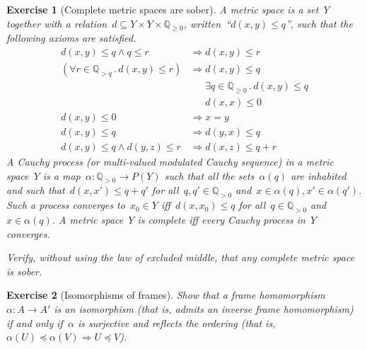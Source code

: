\documentclass{ws-rv9x6}
\newtheorem{ex}{Exercise}
\newenvironment{exercise}[1]{
  \begin{ex}[#1]
}{\end{ex}}
\newcommand{\QQ}{\mathbb{Q}}
\renewcommand{\_}{\mathpunct{.}}
\newcommand{\?}{\,{:}\,}
\begin{document}
\begin{exercise}{Complete metric spaces are sober}
A \emph{metric space} is a set~$Y$ together with a relation~$d \subseteq Y
\times Y \times \QQ_{\geq0}$, written~``$d(x,y) \leq q$'', such that the
following axioms are satisfied.
\begin{align*}
  d(x,y) \leq q \wedge q \leq r &\Longrightarrow d(x,y) \leq r \\
  (\forall r \in \QQ_{> q}\_ d(x,y) \leq r) &\Longrightarrow d(x,y) \leq q \\
  &\mathrel{\phantom{\Longrightarrow}} \exists q \in \QQ_{\geq0}\_ d(x,y) \leq q \\
  &\mathrel{\phantom{\Longrightarrow}} d(x,x) \leq 0 \\
  d(x,y) \leq 0 &\Longrightarrow x = y \\
  d(x,y) \leq q &\Longrightarrow d(y,x) \leq q \\
  d(x,y) \leq q \wedge d(y,z) \leq r &\Longrightarrow d(x,z) \leq q+r
\end{align*}
A \emph{Cauchy process} (or \emph{multi-valued modulated Cauchy sequence}) in a metric
space~$Y$ is a map~$\alpha : \QQ_{>0} \to P(Y)$ such that all the sets~$\alpha(q)$
are inhabited and such that~$d(x,x') \leq q + q'$ for all~$q,q' \in \QQ_{>0}$
and~$x \in \alpha(q), x' \in \alpha(q')$. Such a process \emph{converges
to}~$x_0 \in Y$ iff~$d(x,x_0) \leq q$ for all~$q \in \QQ_{>0}$
and~$x \in \alpha(q)$. A metric space~$Y$ is \emph{complete} iff every Cauchy
process in~$Y$ converges.

Verify, without using the law of excluded middle, that any complete metric
space is sober. \smallskip

\end{exercise}

\begin{exercise}{Isomorphisms of frames}%
\label{ex:isomorphisms-of-frames}%
Show that a frame homomorphism~$\alpha : A \to A'$ is an isomorphism (that is,
admits an inverse frame homomorphism) if and only if~$\alpha$ is surjective and
reflects the ordering (that is,~$\alpha(U) \preceq \alpha(V) \Rightarrow U
\preceq V$).
\end{exercise}
\end{document}
